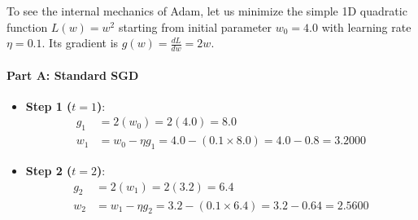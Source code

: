 \begin{example}
To see the internal mechanics of Adam, let us minimize the simple 1D quadratic function $L(w) = w^2$ starting from initial parameter $w_0 = 4.0$ with learning rate $\eta = 0.1$.
Its gradient is $g(w) = \frac{dL}{dw} = 2w$.

\paragraph{Part A: Standard SGD}
\begin{itemize}
    \item \textbf{Step 1 ($t = 1$)}:
    \begin{align*}
    g_1 &= 2(w_0) = 2(4.0) = 8.0 \\
    w_1 &= w_0 - \eta g_1 = 4.0 - (0.1 \times 8.0) = 4.0 - 0.8 = \mathbf{3.2000}
    \end{align*}
    \item \textbf{Step 2 ($t = 2$)}:
    \begin{align*}
    g_2 &= 2(w_1) = 2(3.2) = 6.4 \\
    w_2 &= w_1 - \eta g_2 = 3.2 - (0.1 \times 6.4) = 3.2 - 0.64 = \mathbf{2.5600}
    \end{align*}
\end{itemize}


\end{example}

